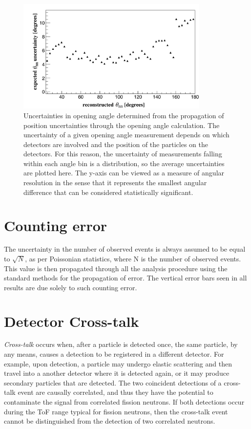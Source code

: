 \begin{figure}[h]
    \centering
    \includegraphics[width = 0.85\textwidth]{Content/Errors/OpeningAngleUncertainty.png}
    \caption{Uncertainties in opening angle determined from the propagation of position uncertainties through the opening angle calculation.
     The uncertainty of a given opening angle measurement depends on which detectors are involved and the position of the particles on the detectors.
     For this reason, the uncertainty of measurements falling within each angle bin is a distribution, so the average uncertainties are plotted here.
    The y-axis can be viewed as a measure of angular resolution in the sense that it represents the smallest angular difference that can be considered statistically significant.
    }
    \label{fig:OpeningAngleRes}
\end{figure}

\section{Counting error}
The uncertainty in the number of observed events is always assumed to be equal to $\sqrt{N}$, as per Poissonian  statistics, where N is the number of observed events.
This value is then propagated through all the analysis procedure using the standard methods for the propagation of error.
The vertical error bars seen in all results are due solely to such counting error.

\FloatBarrier
\section{Detector Cross-talk}
\label{crosstalk}
\textit{Cross-talk} occurs when, after a particle is detected once, the same particle, by any means, causes a detection to be registered in a different detector.
For example, upon detection, a particle may undergo elastic scattering and then travel into a another detector where it is detected again, or it may produce secondary particles that are detected.
The two coincident detections of a cross-talk event are causally correlated, and thus they have the potential to contaminate the signal from correlated fission neutrons.
If both detections occur during the ToF range typical for fission neutrons, then the cross-talk event cannot be distinguished from the detection of two correlated neutrons.

